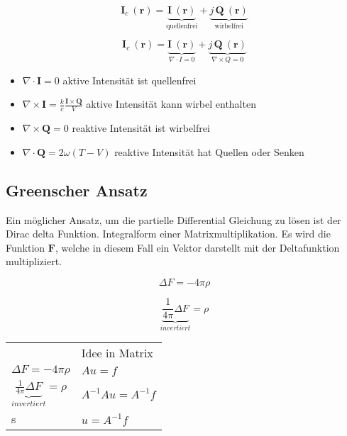 \begin{equation}
\mathbf{I}_c ~(\mathbf{r}) = \underbrace{\mathbf{I}~(\mathbf{r})}_{\text{quellenfrei}} + \underbrace{j\,\mathbf{Q}~(\mathbf{r})}_{\text{wirbelfrei}}
\label{helmholtz:KomplexeIntensitaet_Zerlegung}
\end{equation}

\begin{equation}
\mathbf{I}_c ~(\mathbf{r}) = \underbrace{\mathbf{I}~(\mathbf{r})}_{\nabla \cdot I = 0} + \underbrace{j\,\mathbf{Q}~(\mathbf{r})}_{\nabla \times Q = 0}
\label{helmholtz:KomplexeIntensitaet_Zerlegung}
\end{equation}

\begin{itemize}
\item $\nabla \cdot \mathbf{I} = 0$ aktive Intensität ist quellenfrei
\item $\nabla \times \mathbf{I} = \frac{k}{c} \frac{\mathbf{I} \times \mathbf{Q}}{V}$ aktive Intensität kann wirbel enthalten
\item $\nabla \times \mathbf{Q} = 0$ reaktive Intensität ist wirbelfrei
\item $\nabla \cdot \mathbf{Q} = 2 \omega (T-V)$ reaktive Intensität hat Quellen oder Senken
\end{itemize}


\subsection{Greenscher Ansatz}
Ein möglicher Ansatz, um die partielle Differential Gleichung zu lösen ist der Dirac delta Funktion. Integralform einer Matrixmultiplikation. Es wird die Funktion $\mathbf{F}$, welche in diesem Fall ein Vektor darstellt mit der Deltafunktion multipliziert.

\begin{equation}
\Delta F = -4 \pi \rho 
\label{helmholtz:DGL_idee}
\end{equation}

\begin{equation}
\underbrace{\frac{1}{4 \pi} \Delta F}_{invertiert} = \rho 
\label{helmholtz:DGL_idee_umformung}
\end{equation}

\begin{tabular}{ll}
  & Idee in Matrix \\
$\Delta F = -4 \pi \rho$  & $Au = f$ \\
$\underbrace{\frac{1}{4 \pi} \Delta F}_{invertiert} = \rho$ & $A^{-1}Au = A^{-1}f$  \\
s & $u = A^{-1}f$  \\
\end{tabular}

